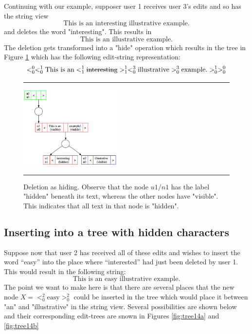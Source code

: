 \documentclass{amsart}
\begin{document}
Continuing with our example, supposer user 1 receives user 3's edits
and so has the string view
\[
\text{This is an interesting illustrative example.}
\]
and deletes the word "interesting". This
results in
\[
\text{This is an illustrative example.}
\]
The deletion gets transformed into a "hide" operation which results in the
tree in Figure \ref{fig:tree14} which has the following edit-string representation:
\[
 <^0_0 <^1_0 
 \text{This is an} 
   <^1_1 \text{\sout{interesting}} >^1_1
  <^3_0 \text{illustrative} >^3_0
  \text{example.} >^1_0 >^0_0
\]

\begin{figure}[h]
\vspace{\baselineskip}
  \hspace{\fill}\rule{\linewidth}{.7pt}\hspace{\fill}
  \vspace{\baselineskip}

\centering
\includegraphics[width=2in]{tree14.jpg}
\caption{Deletion as hiding. Observe that the node $u1/n1$ has the
label "hidden"  beneath its text, whereas the other nodes have "visible".
This indicates that all text in that node is "hidden". \label{fig:tree14}}

\vspace{\baselineskip}%
  \hspace{\fill}\rule{\linewidth}{.7pt}\hspace{\fill}%
\vspace{\baselineskip}%
\end{figure}

\subsection{Inserting into a tree with hidden characters}
Suppose now that user 2 has received all of these edits
and wishes to insert the word ``easy''
into the place where ``interested'' had just been deleted by user 1.
This would result in the following string:
\[
\text{This is an easy illustrative example.}
\]
The point we want to make here is that there are several places that the new node
$X = <^2_0 \text{easy} >^2_0$ could be inserted in the tree
which would place it between "an" and "illustrative" in the string view.
Several possibilities are shown below and their corresponding edit-trees
are snown in Figures \ref{fig:tree14a} and \ref{fig:tree14b}
\end{document}
